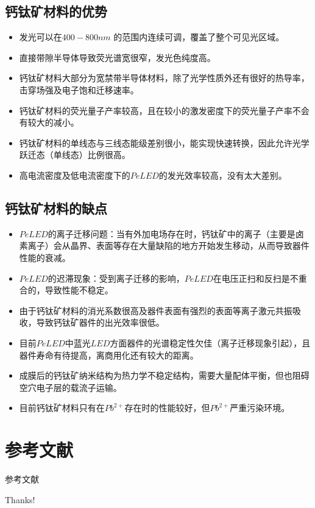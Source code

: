 \documentclass{beamer}[fontset=windows]
\begin{document}
\subsection{钙钛矿材料的优势}
\begin{frame}
\begin{itemize}
	\item 发光可以在$400-800 nm$ 的范围内连续可调，覆盖了整个可见光区域。
	\item 直接带隙半导体导致荧光谱宽很窄，发光色纯度高。
	\item 钙钛矿材料大部分为宽禁带半导体材料，除了光学性质外还有很好的热导率，击穿场强及电子饱和迁移速率。
	\item 钙钛矿材料的荧光量子产率较高，且在较小的激发密度下的荧光量子产率不会有较大的减小。
	\item 钙钛矿材料的单线态与三线态能级差别很小，能实现快速转换，因此允许光学跃迁态（单线态）比例很高。
	\item 高电流密度及低电流密度下的$PeLED$的发光效率较高，没有太大差别。
\end{itemize}
\end{frame}

\subsection{钙钛矿材料的缺点}
\begin{frame}
\begin{itemize}
	\item $PeLED$的离子迁移问题：当有外加电场存在时，钙钛矿中的离子（主要是卤素离子）会从晶界、表面等存在大量缺陷的地方开始发生移动，从而导致器件性能的衰减。
	\item $PeLED$的迟滞现象：受到离子迁移的影响，$PeLED$在电压正扫和反扫是不重合的，导致性能不稳定。
	\item 由于钙钛矿材料的消光系数很高及器件表面有强烈的表面等离子激元共振吸收，导致钙钛矿器件的出光效率很低。
	\item 目前$PeLED$中蓝光$LED$方面器件的光谱稳定性欠佳（离子迁移现象引起），且器件寿命有待提高，离商用化还有较大的距离。
	\item 成膜后的钙钛矿纳米结构为热力学不稳定结构，需要大量配体平衡，但也阻碍空穴电子层的载流子运输。
	\item 目前钙钛矿材料只有在$Pb^{2+}$存在时的性能较好，但$Pb^{2+}$严重污染环境。
\end{itemize}
\end{frame}


\section{参考文献}	
\begin{frame}[allowframebreaks]{参考文献}
\printbibliography[heading=none]
\end{frame}
\begin{frame}
	\begin{center}
		{\Huge\calligra Thanks!}
	\end{center}
\end{frame}
\end{document}
